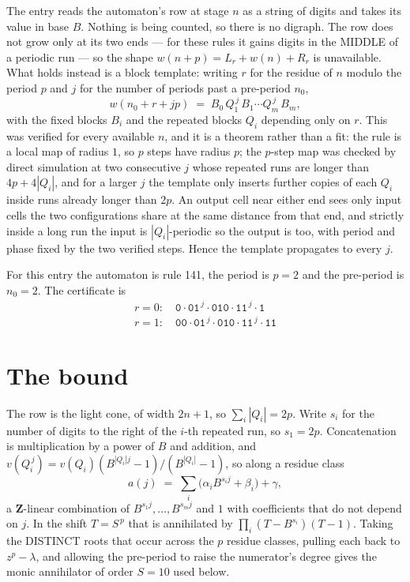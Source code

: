 \documentclass[11pt,a4paper]{article}
\theoremstyle{plain}
\theoremstyle{definition}
\begin{document}
The entry reads the automaton's row at stage $n$ as a string of digits and takes its value in
base $B$. Nothing is being counted, so there is no digraph. The row does not grow only at its
two ends --- for these rules it gains digits in the MIDDLE of a periodic run --- so the shape
$w(n+p)=L_r+w(n)+R_r$ is unavailable. What holds instead is a block template: writing $r$ for
the residue of $n$ modulo the period $p$ and $j$ for the number of periods past a pre-period
$n_0$,
\[
w(n_0 + r + jp)\;=\;B_0\,Q_1^{\,j}\,B_1\cdots Q_m^{\,j}\,B_m,
\]
with the fixed blocks $B_i$ and the repeated blocks $Q_i$ depending only on $r$. This was
verified for every available $n$, and it is a theorem rather than a fit: the rule is a local
map of radius $1$, so $p$ steps have radius $p$; the $p$-step map was checked by direct
simulation at two consecutive $j$ whose repeated runs are longer than $4p+4|Q_i|$, and for a
larger $j$ the template only inserts further copies of each $Q_i$ inside runs already longer
than $2p$. An output cell near either end sees only input cells the two configurations share
at the same distance from that end, and strictly inside a long run the input is
$|Q_i|$-periodic so the output is too, with period and phase fixed by the two verified steps.
Hence the template propagates to every $j$.

For this entry the automaton is rule 141, the period is $p=2$ and the pre-period is $n_0=2$.
The certificate is
\begin{gather*}
r=0:\quad \texttt{0} \cdot \texttt{01}^{\,j} \cdot \texttt{010} \cdot \texttt{11}^{\,j} \cdot \texttt{1} \\
r=1:\quad \texttt{00} \cdot \texttt{01}^{\,j} \cdot \texttt{010} \cdot \texttt{11}^{\,j} \cdot \texttt{11}
\end{gather*}

\section{The bound}

The row is the light cone, of width $2n+1$, so $\sum_i|Q_i|=2p$. Write $s_i$ for the number of
digits to the right of the $i$-th repeated run, so $s_1=2p$. Concatenation is multiplication by
a power of $B$ and addition, and $v(Q_i^{\,j})=v(Q_i)(B^{|Q_i|j}-1)/(B^{|Q_i|}-1)$, so along a
residue class
\[
a(j)\;=\;\sum_i \big(\alpha_i B^{s_i j} + \beta_i\big) + \gamma,
\]
a $\mathbf{Z}$-linear combination of $B^{s_1 j},\dots,B^{s_m j}$ and $1$ with coefficients that
do not depend on $j$. In the shift $T=S^{\,p}$ that is annihilated by
$\prod_i(T-B^{s_i})(T-1)$. Taking the DISTINCT roots that occur across the $p$ residue classes,
pulling each back to $z^p-\lambda$, and allowing the pre-period to raise the numerator's degree
gives the monic annihilator of order $S=10$ used below.
\end{document}
